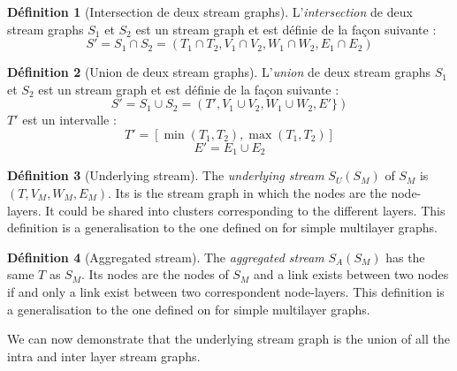 \documentclass[11pt,a4paper]{article}
\theoremstyle{definition}
\newtheorem{defn}{Définition}
\theoremstyle{remark}
\theoremstyle{remark}
\begin{document}
	\begin{defn}[Intersection de deux stream graphs]
	L'{\em intersection} de deux stream graphs $S_1$ et $S_2$ est un stream graph et est définie de la façon suivante :
	\[
		S' = S_1 \cap S_2 = (T_1\cap T_2, V_1 \cap V_2, W_1 \cap W_2, E_1\cap E_2)
	\]
	\end{defn}
	

	\begin{defn}[Union de deux stream graphs]
	L'{\em union} de deux stream graphs $S_1$ et $S_2$ est un stream graph et est définie de la façon suivante :
	\[
		S' = S_1 \cup S_2 = (T', V_1 \cup V_2, W_1 \cup W_2, E' \})
	\]
	$T'$ est un intervalle :
	\[
		T' = [\min(T_1,T_2),\max(T_1,T_2)]
	\]
	\[
		E' = E_1 \cup E_2 
	\]
	
	\end{defn}
	
	
	\begin{defn}[Underlying stream]
		The {\em underlying stream } $S_U(S_M)$ of $S_M$ is $(T,V_M,W_M,E_M)$. Its is the stream graph in which the nodes are the node-layers. It could be shared into clusters corresponding to the different layers. This definition is a generalisation to the one defined on \cite{mlkiv} for simple multilayer graphs.
	\end{defn}
	
	\begin{defn}[Aggregated stream]
		
		The {\em aggregated stream} $S_A(S_M)$ has the same $T$ as $S_M$. Its nodes are the nodes of $S_M$ and a link exists between two nodes if and only a link exist between two correspondent node-layers.	This definition is a generalisation to the one defined on \cite{mldd} for simple multilayer graphs.
	
	\end{defn}
	
	We can now demonstrate that the underlying stream graph is the union of all the intra and inter layer stream graphs.
	
\end{document}
